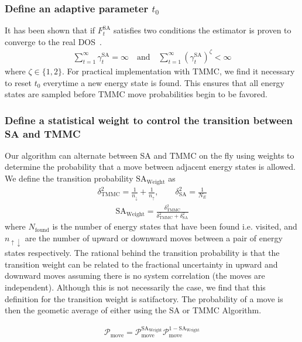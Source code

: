 \documentclass[letterpaper,twocolumn,amsmath,amssymb,pre,aps,10pt]{revtex4-1}
\begin{document}
\subsubsection{Define an adaptive parameter $t_0$}
It has been shown that if $F_{t}^{\text{SA}}$ satisfies two conditions
the estimator is proven to converge to the real
DOS~\cite{liang2006theory, liang2007stochastic}.
\begin{align}
\sum_{t=1}^\infty \gamma_{t}^{\text{SA}} = \infty \quad\textrm{and}\quad
\sum_{t=1}^\infty (\gamma_{t}^{\text{SA}})^\zeta < \infty
\end{align}
where $\zeta \in \{1,2\}$.  For practical implementation with TMMC, we
find it necessary to reset $t_0$ everytime a new energy state is found.
This ensures that all energy states are sampled before TMMC move
probabilities begin to be favored.

\subsubsection{Define a statistical weight to control the transition between SA and TMMC}
Our algorithm can alternate between SA and TMMC on the fly using
weights to determine the probability that a move between adjacent
energy states is allowed.  We define the transition probability
$\text{SA}_{\text{Weight}}$ as
\begin{align}
\delta_{\text{TMMC}}^2 =\frac{1}{n_\downarrow}+\frac{1}{n_\uparrow}, \quad\quad
\delta_{\text{SA}}^2 = \frac{1}{N_E}
\end{align}
\begin{align}
\text{SA}_{\text{Weight}} =\frac{\delta_{\text{TMMC}}^2}{\delta_{\text{TMMC}}^2 + \delta_{\text{SA}}^2}
\end{align}
where $N_\text{found}$ is the number of energy states that have been
found i.e. visited, and $n_{\uparrow\downarrow}$ are the number of
upward or downward moves between a pair of energy states respectively.
The rational behind the transition probability is that the transition
weight can be related to the fractional uncertainty in upward and
downward moves assuming there is no system correlation (the moves are
independent).  Although this is not necessarily the case, we find that
this definition for the transition weight is satifactory. The
probability of a move is then the geometic average of either using the
SA or TMMC Algorithm.

\begin{align}
\mathcal{P}_\text{move} = \mathcal{P}_\text{move}^{\text{SA}_\text{Weight}} \mathcal{P}_\text{move}^{1-\text{SA}_\text{Weight}}
\end{align}
\end{document}
